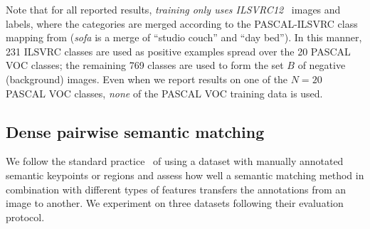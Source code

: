 \documentclass[10pt,twocolumn,letterpaper]{article}
\begin{document}
Note that for all reported results, \emph{training only uses ILSVRC12}~\cite{deng09imagenet} images and labels, where the categories are merged according to the PASCAL-ILSVRC class mapping from \cite{deng09imagenet} (\eg\textit{sofa} is a merge of ``studio couch'' and ``day bed''). In this manner, 231 ILSVRC classes are used as positive examples spread over the 20 PASCAL VOC classes; the remaining 769 classes are used to form the set $B$ of negative (background) images. Even when we report results on one of the $N=20$ PASCAL VOC \cite{everingham10voc} classes, \textit{none} of the PASCAL VOC training data is used. 

\subsection{Dense pairwise semantic matching}\label{sec:expmatching}

We follow the standard practice~\cite{zhou15flowweb,ham2016} of using a dataset with manually annotated semantic keypoints or regions and assess how well a semantic matching method in combination with different types of features transfers the annotations from an image to another. We experiment on three datasets following their evaluation protocol.
\end{document}
